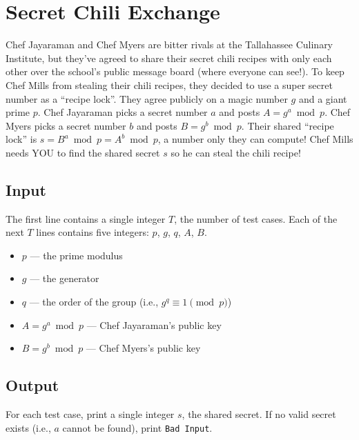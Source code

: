 \documentclass{article}
\let\oldsection\section
\renewcommand\section{\clearpage\oldsection}
\begin{document}
\section{Secret Chili Exchange}

Chef Jayaraman and Chef Myers are bitter rivals at the Tallahassee Culinary Institute, but they've agreed to share their secret chili recipes with only each other over the school's public message board (where everyone can see!). To keep Chef Mills from stealing their chili recipes, they decided to use a super secret number as a ``recipe lock''. \newline \newline
They agree publicly on a magic number $g$ and a giant prime $p$. Chef Jayaraman picks a secret number $a$ and posts $A = g^a \bmod p$. Chef Myers picks a secret number $b$ and posts $B = g^b \bmod p$. Their shared ``recipe lock'' is $s = B^a \bmod p = A^b \bmod p$, a number only they can compute! \newline \newline
Chef Mills needs YOU to find the shared secret $s$ so he can steal the chili recipe!

\subsection{Input}

The first line contains a single integer $T$, the number of test cases. Each of the next $T$ lines contains five integers: $p$, $g$, $q$, $A$, $B$.

\begin{itemize}
    \item $p$ — the prime modulus
    \item $g$ — the generator
    \item $q$ — the order of the group (i.e., $g^q \equiv 1 \pmod{p}$)
    \item $A = g^a \bmod p$ — Chef Jayaraman's public key
    \item $B = g^b \bmod p$ — Chef Myers's public key
\end{itemize}

\subsection{Output}

For each test case, print a single integer $s$, the shared secret. If no valid secret exists (i.e., $a$ cannot be found), print \texttt{Bad Input}.
\end{document}
